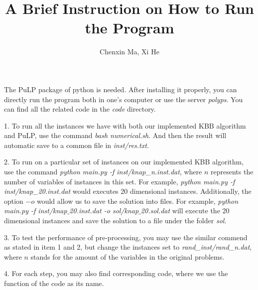 \documentclass[a4paper,10pt]{article}
\title{A Brief Instruction on How to Run the Program}
\author{Chenxin Ma, Xi He}
\begin{document}
\maketitle

The PuLP package of python is needed. After installing it properly, you can directly run the program both in one's computer or use the server \textit{polyps}. You can find all the related code in the \textit{code} directory. 

\begin{description}
\item{1.} To run all the instances we have with both our implemented KBB algorithm and PuLP, use the command \textit{bash numerical.sh}. And then the result will automatic save to a common file in \textit{inst/res.txt}.
\item{2.} To run on a particular set of instances on our implemented KBB algorithm, use the command \textit{python main.py -f inst/knap\_n.inst.dat}, where $n$ represents the number of variables of instances in this set. For example, \textit{python main.py -f inst/knap\_20.inst.dat} would executes 20 dimensional instances. Additionally, the option $-o$ would allow us to save the solution into files. For example, \textit{python main.py -f inst/knap$\_$20.inst.dat -o sol/knap$\_$20.sol.dat} will execute the 20 dimensional instances and save the solution to a file under the folder \textit{sol}. 
\item{3.} To test the performance of pre-processing, you may use the similar commend as stated in item 1 and  2, but change the instances set to \textit{rand\_inst/rand\_n.dat}, where $n$ stands for the amount of the variables in the original problems.
\item{4.} For each step, you may also find corresponding code, where we use the function of the code as its name.
\end{description}
\end{document}
